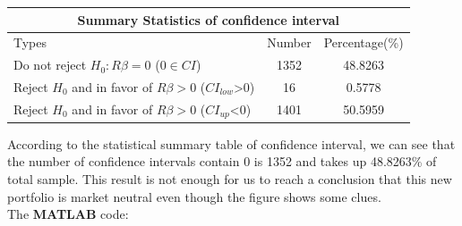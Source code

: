 \documentclass[12pt,letterpaper]{article}
\begin{document}
\begin{enumerate}[label=\textbf{(\Alph*)}]
\begin{table}[ht]
\centering %
\begin{tabular}{lcc} %
\hline\hline %
\multicolumn{3}{c}{Summary Statistics of confidence interval}\\ [0.5ex]%
\hline Types & Number & Percentage(\%)\\
\hline
Do not reject $H_0:R\beta=0$ ($0 \in CI$) & 1352 & 48.8263 \\
Reject $H_0$ and in favor of $R\beta>0$ ($CI_{low}$>0) & 16 & 0.5778\\
Reject $H_0$ and in favor of $R\beta>0$ ($CI_{up}$<0) & 1401 & 50.5959 \\
\hline %
\end{tabular}
\end{table}

According to the statistical summary table of confidence interval, we can see that the number of confidence intervals contain 0 is 1352 and takes up 48.8263\% of total sample. This result is not enough for us to reach a conclusion that this new portfolio is market neutral even though the figure shows some clues. \\

The \textbf{MATLAB} code:
   

\newpage
\end{enumerate}

\end{document}
